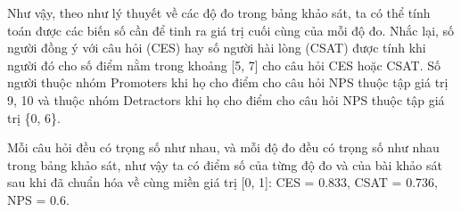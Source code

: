 Như vậy, theo như lý thuyết về các độ đo trong bảng khảo sát, ta có thể tính toán được các biến số cần để tinh ra giá trị cuối cùng của mỗi độ đo.
Nhắc lại, số người đồng ý với câu hỏi (CES) hay số người hài lòng (CSAT) được tính khi người đó cho số điểm nằm trong khoảng [5, 7] cho câu hỏi CES 
hoặc CSAT. Số người thuộc nhóm Promoters khi họ cho điểm cho câu hỏi NPS thuộc tập giá trị {9, 10} và thuộc nhóm Detractors khi họ cho điểm cho câu hỏi 
NPS thuộc tập giá trị \{0, 6\}.
\begin{table}[H]
    \def\arraystretch{1.5}%
    \centering
    \caption{Bảng kết quả tính toán mỗi câu hỏi}
\end{table}
Mỗi câu hỏi đều có trọng số như nhau, và mỗi độ đo đều có trọng số như nhau trong bảng khảo sát, như vậy ta có điểm số của từng độ đo và của bài khảo sát sau khi đã chuẩn hóa về cùng miền giá trị [0, 1]: CES = 0.833, CSAT = 0.736, NPS = 0.6.

